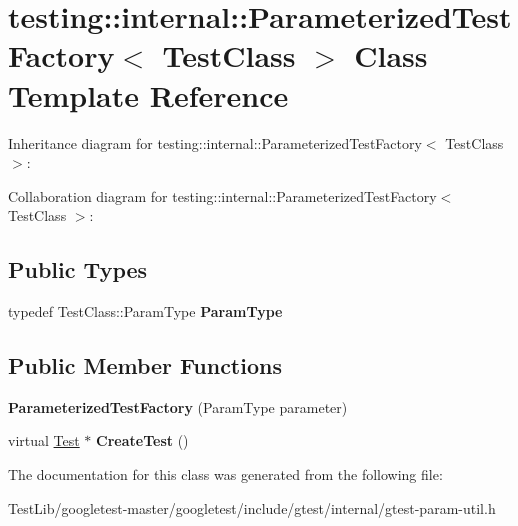 \hypertarget{classtesting_1_1internal_1_1ParameterizedTestFactory}{}\section{testing\+:\+:internal\+:\+:Parameterized\+Test\+Factory$<$ Test\+Class $>$ Class Template Reference}
\label{classtesting_1_1internal_1_1ParameterizedTestFactory}


Inheritance diagram for testing\+:\+:internal\+:\+:Parameterized\+Test\+Factory$<$ Test\+Class $>$\+:


Collaboration diagram for testing\+:\+:internal\+:\+:Parameterized\+Test\+Factory$<$ Test\+Class $>$\+:
\subsection*{Public Types}
\begin{DoxyCompactItemize}
\item 
\mbox{\label{classtesting_1_1internal_1_1ParameterizedTestFactory_ad9a27b8e1a83de2f1687625bccff460d}} 
typedef Test\+Class\+::\+Param\+Type {\bfseries Param\+Type}
\end{DoxyCompactItemize}
\subsection*{Public Member Functions}
\begin{DoxyCompactItemize}
\item 
\mbox{\label{classtesting_1_1internal_1_1ParameterizedTestFactory_a82d78356cd402224255edec760a048fb}} 
{\bfseries Parameterized\+Test\+Factory} (Param\+Type parameter)
\item 
\mbox{\label{classtesting_1_1internal_1_1ParameterizedTestFactory_ae17e73e91f7fd5d49ca238c005ef4960}} 
virtual \hyperlink{classtesting_1_1Test}{Test} $\ast$ {\bfseries Create\+Test} ()
\end{DoxyCompactItemize}


The documentation for this class was generated from the following file\+:\begin{DoxyCompactItemize}
\item 
Test\+Lib/googletest-\/master/googletest/include/gtest/internal/gtest-\/param-\/util.\+h\end{DoxyCompactItemize}
